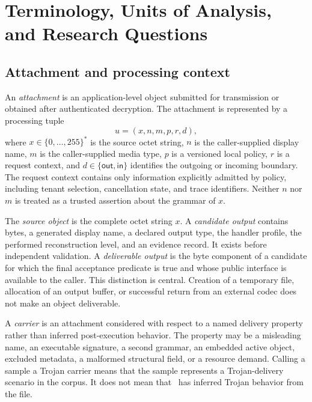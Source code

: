 \section{Terminology, Units of Analysis, and Research Questions}
\label{sec:terminology-questions}

\subsection{Attachment and processing context}

An \emph{attachment} is an application-level object submitted for transmission
or obtained after authenticated decryption. The attachment is represented by a
processing tuple
\begin{equation}
  u = (x,n,m,p,r,d),
  \label{eq:processing-unit}
\end{equation}
where $x\in\{0,\ldots,255\}^{*}$ is the source octet string, $n$ is the caller-supplied
display name, $m$ is the caller-supplied media type, $p$ is a versioned local
policy, $r$ is a request context, and $d\in\{\mathsf{out},\mathsf{in}\}$
identifies the outgoing or incoming boundary. The request context contains
only information explicitly admitted by policy, including tenant selection,
cancellation state, and trace identifiers. Neither $n$ nor $m$ is treated as a
trusted assertion about the grammar of $x$.

The \emph{source object} is the complete octet string $x$. A
\emph{candidate output} contains bytes, a generated display name, a declared
output type, the handler profile, the performed reconstruction level, and an
evidence record. It exists before independent validation. A \emph{deliverable
output} is the byte component of a candidate for which the final acceptance
predicate is true and whose public interface is available to the caller. This
distinction is central.
Creation of a temporary file, allocation of an output buffer, or successful
return from an external codec does not make an object deliverable.

A \emph{carrier} is an attachment considered with respect to a named delivery
property rather than inferred post-execution behavior. The property may be a
misleading name, an executable signature, a second grammar, an embedded active
object, excluded metadata, a malformed structural field, or a resource demand.
Calling a sample a Trojan carrier means that the sample represents a
Trojan-delivery scenario in the corpus. It does not mean that \AFD\ has inferred
Trojan behavior from the file.

